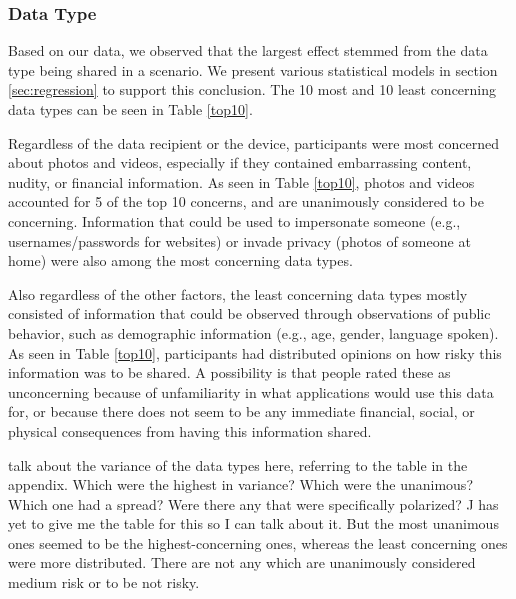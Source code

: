 \subsubsection{Data Type}
Based on our data, we observed that the largest effect stemmed from the data type being shared in a scenario. We present various statistical models in section \ref{sec:regression} to support this conclusion. The 10 most and 10 least concerning data types can be seen in Table \ref{top10}. 

Regardless of the data recipient or the device, participants were most concerned about photos and videos, especially if they contained embarrassing content, nudity, or financial information. As seen in Table \ref{top10}, photos and videos accounted for 5 of the top 10 concerns, {\color {red} and are unanimously considered to be concerning}. Information that could be used to impersonate someone (e.g., usernames/passwords for websites) or invade privacy (photos of someone at home) were also among the most concerning data types. 

Also regardless of the other factors, the least concerning data types mostly consisted of information that could be observed through observations of public behavior, such as demographic information (e.g., age, gender, language spoken). {\color {red} As seen in Table \ref{top10}, participants had distributed opinions on how risky this information was to be shared. A possibility is that people rated these as unconcerning because of unfamiliarity in what applications would use this data for, or because there does not seem to be any immediate financial, social, or physical consequences from having this information shared.}

{\color {red} talk about the variance of the data types here, referring to the table in the appendix. Which were the highest in variance? Which were the unanimous? Which one had a spread? Were there any that were specifically polarized? J has yet to give me the table for this so I can talk about it. But the most unanimous ones seemed to be the highest-concerning ones, whereas the least concerning ones were more distributed. There are not any which are unanimously considered medium risk or to be not risky.}

